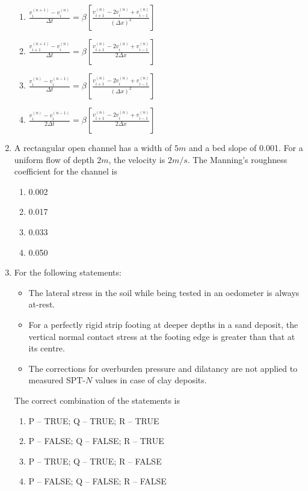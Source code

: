 \documentclass[journal,12pt,onecolumn]{IEEEtran}
\theoremstyle{remark}
\begin{document}
\begin{enumerate}
\hfill{}
\begin{enumerate}
\item $\frac{v_i^{(n+1)} - v_i^{(n)}}{\Delta t} = \beta \left[ \frac{v_{i+1}^{(n)} - 2 v_i^{(n)} + v_{i-1}^{(n)}}{(\Delta x)^2} \right]$
\item $\frac{v_{i+1}^{(n+1)} - v_i^{(n)}}{\Delta t} = \beta \left[ \frac{v_{i+1}^{(n)} - 2 v_i^{(n)} + v_{i-1}^{(n)}}{2 \Delta x} \right]$
\item $\frac{v_i^{(n)} - v_i^{(n-1)}}{\Delta t} = \beta \left[ \frac{v_{i+1}^{(n)} - 2 v_i^{(n)} + v_{i-1}^{(n)}}{(\Delta x)^2} \right]$  
\item $\frac{v_i^{(n)} - v_i^{(n-1)}}{2 \Delta t} = \beta \left[ \frac{v_{i+1}^{(n)} - 2 v_i^{(n)} + v_{i-1}^{(n)}}{2 \Delta x} \right]$
\end{enumerate}
    
\item A rectangular open channel has a width of $5m$ and a bed slope of 0.001. For a uniform flow of depth $2m$, the velocity is $2m/s$. The Manning's roughness coefficient for the channel is

\hfill{}
\begin{enumerate}
\item 0.002
\item 0.017
\item 0.033
\item 0.050
\end{enumerate}

\item For the following statements:
\begin{itemize}
\item The lateral stress in the soil while being tested in an oedometer is always at-rest.
\item For a perfectly rigid strip footing at deeper depths in a sand deposit, the vertical normal contact stress at the footing edge is greater than that at its centre.
\item The corrections for overburden pressure and dilatancy are not applied to measured SPT-$N$ values in case of clay deposits.
\end{itemize}
The correct combination of the statements is

\hfill{}
\begin{enumerate}
\item P -- TRUE; \quad Q -- TRUE; \quad R -- TRUE
\item P -- FALSE; \quad Q -- FALSE; \quad R -- TRUE
\item P -- TRUE; \quad Q -- TRUE; \quad R -- FALSE
\item P -- FALSE; \quad Q -- FALSE; \quad R -- FALSE
\end{enumerate}
    

\end{enumerate}
\end{document}
